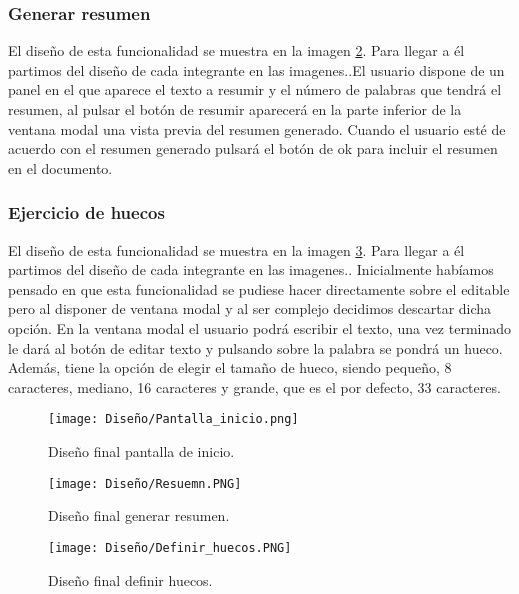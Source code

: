 \subsubsection{Generar resumen}
El diseño de esta funcionalidad se muestra en la imagen \ref{resuemn}. Para llegar a él partimos del diseño de cada integrante en las imagenes..El usuario dispone de un panel en el que aparece el texto a resumir y el número de palabras que tendrá el resumen, al pulsar el botón de resumir aparecerá en la parte inferior de la ventana modal una vista previa del resumen generado. Cuando el usuario esté de acuerdo con el resumen generado pulsará el botón de ok para incluir el resumen en el documento.

\subsubsection{Ejercicio de huecos}
El diseño de esta funcionalidad se muestra en la imagen \ref{definir_hueco}. Para llegar a él partimos del diseño de cada integrante en las imagenes.. Inicialmente habíamos pensado en que esta funcionalidad se pudiese hacer directamente sobre el editable pero al disponer de ventana modal y al ser complejo decidimos descartar dicha opción. En la ventana modal el usuario podrá escribir el texto, una vez terminado le dará al botón de editar texto y pulsando sobre la palabra se pondrá un hueco. Además, tiene la opción de elegir el tamaño de hueco, siendo pequeño, 8 caracteres, mediano, 16 caracteres y grande, que es el por defecto, 33 caracteres.  

\begin{figure}[ht!]
  \centering
  \texttt{[image: Diseño/Pantalla\_inicio.png]}
  \caption{Diseño final pantalla de inicio.}
  \label{pantallaInicio}
\end{figure}

\begin{figure}[ht!]
  \centering
  \texttt{[image: Diseño/Resuemn.PNG]}
  \caption{Diseño final generar resumen.}
  \label{resuemn}
\end{figure}

\begin{figure}[ht!]
  \centering
  \texttt{[image: Diseño/Definir\_huecos.PNG]}
  \caption{Diseño final definir huecos.}
  \label{definir_hueco}
\end{figure}

